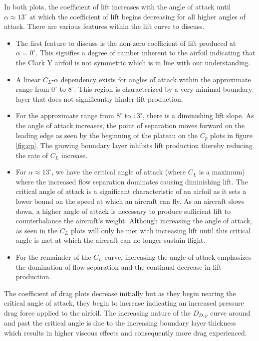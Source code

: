\documentclass[runningheads]{llncs}
\begin{document}
\noindent
In both plots, the coefficient of lift increases with the angle of attack until $\alpha\approx13^\circ$ at which the coefficient of lift begins decreasing for all higher angles of attack. There are various features within the lift curve to discuss.

\begin{itemize}

    \item The first feature to discuss is the non-zero coefficient of lift produced at $\alpha=0^\circ$. This signifies a degree of camber inherent to the airfoil indicating that the Clark Y airfoil is not symmetric which is in line with our understanding.
    
    \item A linear $C_L$-$\alpha$ dependency exists for angles of attack within the approximate range from $0^\circ$ to $8^\circ$. This region is characterized by a very minimal boundary layer that does not significantly hinder lift production.
    
    \item For the approximate range from $8^\circ$ to $13^\circ$, there is a diminishing lift slope. As the angle of attack increases, the point of separation moves forward on the leading edge as seen by the beginning of the plateau on the $C_p$ plots in figure \ref{fig:cp}. The growing boundary layer inhibits lift production thereby reducing the rate of $C_L$ increase.
    
    \item For $\alpha\approx13^\circ$, we have the critical angle of attack (where $C_L$ is a maximum) where the increased flow separation dominates causing diminishing lift. The critical angle of attack is a significant characteristic of an airfoil as it sets a lower bound on the speed at which an aircraft can fly. As an aircraft slows down, a higher angle of attack is necessary to produce sufficient lift to counterbalance the aircraft's weight. Although increasing the angle of attack, as seen in the $C_L$ plots will only be met with increasing lift until this critical angle is met at which the aircraft can no longer sustain flight.
    
    \item For the remainder of the $C_L$ curve, increasing the angle of attack emphasizes the domination of flow separation and the continual decrease in lift production.
\end{itemize}

\noindent
The coefficient of drag plots decrease initially but as they begin nearing the critical angle of attack, they begin to increase indicating an increased pressure drag force applied to the airfoil. The increasing nature of the $D_{D,p}$ curve around and past the critical angle is due to the increasing boundary layer thickness which results in higher viscous effects and consequently more drag experienced.\newline
\end{document}
